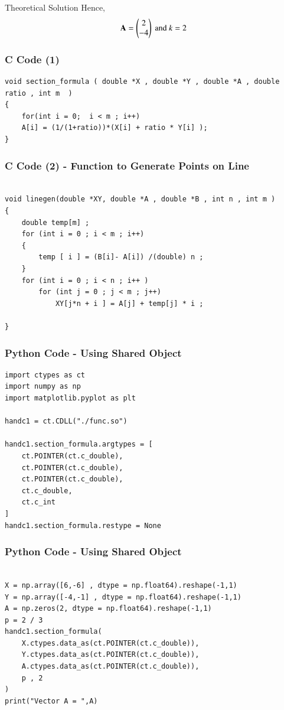 \documentclass{beamer}
\begin{document}
\begin{frame}{Theoretical Solution}
Hence, 
\begin{align}
  \mathbf{A} = \begin{pmatrix}2 \\ -4\end{pmatrix} \text{ and } k = 2
\end{align}
\end{frame}

\begin{frame}[fragile]
    \frametitle{C Code (1)}

    \begin{lstlisting}
void section_formula ( double *X , double *Y , double *A , double ratio , int m  )
{
    for(int i = 0;  i < m ; i++)	
	A[i] = (1/(1+ratio))*(X[i] + ratio * Y[i] );
}
    \end{lstlisting}
\end{frame}

\begin{frame}[fragile]
    \frametitle{C Code (2) - Function to Generate Points on Line}
    \begin{lstlisting}
    
void linegen(double *XY, double *A , double *B , int n , int m )
{
    double temp[m] ; 
    for (int i = 0 ; i < m ; i++)
    {
        temp [ i ] = (B[i]- A[i]) /(double) n ; 
    }
    for (int i = 0 ; i < n ; i++ )
        for (int j = 0 ; j < m ; j++)
            XY[j*n + i ] = A[j] + temp[j] * i ; 
           
}

\end{lstlisting}
\end{frame}

\begin{frame}[fragile]
    \frametitle{Python Code - Using Shared Object}
    \begin{lstlisting}
import ctypes as ct
import numpy as np
import matplotlib.pyplot as plt

handc1 = ct.CDLL("./func.so")

handc1.section_formula.argtypes = [
    ct.POINTER(ct.c_double),
    ct.POINTER(ct.c_double),
    ct.POINTER(ct.c_double),
    ct.c_double,
    ct.c_int
]
handc1.section_formula.restype = None

\end{lstlisting}
\end{frame}

\begin{frame}[fragile]
    \frametitle{Python Code - Using Shared Object}
    \begin{lstlisting}

X = np.array([6,-6] , dtype = np.float64).reshape(-1,1)
Y = np.array([-4,-1] , dtype = np.float64).reshape(-1,1)
A = np.zeros(2, dtype = np.float64).reshape(-1,1)
p = 2 / 3 
handc1.section_formula(
    X.ctypes.data_as(ct.POINTER(ct.c_double)),
    Y.ctypes.data_as(ct.POINTER(ct.c_double)),
    A.ctypes.data_as(ct.POINTER(ct.c_double)),
    p , 2
)
print("Vector A = ",A)

\end{lstlisting}
\end{frame}
\end{document}
